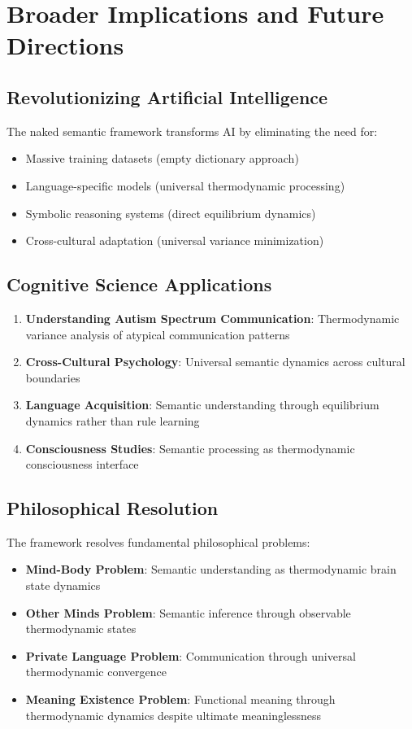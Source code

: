 \documentclass[11pt,a4paper]{article}
\begin{document}
\section{Broader Implications and Future Directions}

\subsection{Revolutionizing Artificial Intelligence}

The naked semantic framework transforms AI by eliminating the need for:
\begin{itemize}
\item Massive training datasets (empty dictionary approach)
\item Language-specific models (universal thermodynamic processing)  
\item Symbolic reasoning systems (direct equilibrium dynamics)
\item Cross-cultural adaptation (universal variance minimization)
\end{itemize}

\subsection{Cognitive Science Applications}

\begin{enumerate}
\item \textbf{Understanding Autism Spectrum Communication}: Thermodynamic variance analysis of atypical communication patterns
\item \textbf{Cross-Cultural Psychology}: Universal semantic dynamics across cultural boundaries
\item \textbf{Language Acquisition}: Semantic understanding through equilibrium dynamics rather than rule learning
\item \textbf{Consciousness Studies}: Semantic processing as thermodynamic consciousness interface
\end{enumerate}

\subsection{Philosophical Resolution}

The framework resolves fundamental philosophical problems:

\begin{itemize}
\item \textbf{Mind-Body Problem}: Semantic understanding as thermodynamic brain state dynamics
\item \textbf{Other Minds Problem}: Semantic inference through observable thermodynamic states  
\item \textbf{Private Language Problem}: Communication through universal thermodynamic convergence
\item \textbf{Meaning Existence Problem}: Functional meaning through thermodynamic dynamics despite ultimate meaninglessness
\end{itemize}
\end{document}
